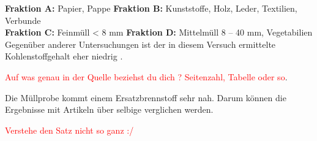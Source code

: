 \begin{table}[h!]
	\centering
	\caption[Elementgehalte von Restabfall und ausgewählter Fraktionen]{Elementgehalte von Restabfall und ausgewählter Fraktionen \cite[S.11]{HansGunterRamke.}}
	\label{tab:tc_vergleich}
\end{table}
\FloatBarrier
{\footnotesize \textbf{Fraktion A:} Papier, Pappe \quad \quad \quad \hspace*{0.7mm} \textbf{Fraktion B:} Kunststoffe, Holz, Leder, Textilien, Verbunde}\\
{\footnotesize \textbf{Fraktion C:} Feinmüll < 8 mm \quad \quad \textbf{Fraktion D:} Mittelmüll 8 – 40 mm, Vegetabilien}\\

Gegenüber anderer Untersuchungen ist der in diesem Versuch ermittelte Kohlenstoffgehalt eher niedrig \cite{Schwarzboeck2018}.

\textcolor{red}{Auf was genau in der Quelle beziehst du dich ? Seitenzahl, Tabelle oder so}. 

Die Müllprobe kommt einem Ersatzbrennstoff sehr nah. Darum können die Ergebnisse mit Artikeln über selbige verglichen werden. 

\textcolor{red}{Verstehe den Satz nicht so ganz :/} \\

